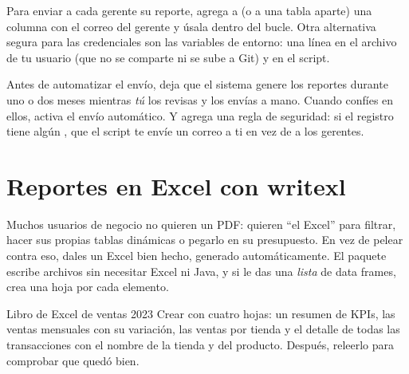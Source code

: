 Para enviar a cada gerente su reporte, agrega a  (o a
una tabla aparte) una columna con el correo del gerente y úsala dentro del
bucle. Otra alternativa segura para las credenciales son las variables de
entorno: una línea  en el archivo
 de tu usuario (que no se comparte ni se sube a Git) y
 en el script.

\begin{consejo}
Antes de automatizar el envío, deja que el sistema genere los reportes
durante uno o dos meses mientras \emph{tú} los revisas y los envías a mano.
Cuando confíes en ellos, activa el envío automático. Y agrega una regla de
seguridad: si el registro tiene algún , que el script te envíe
un correo a ti en vez de a los gerentes.
\end{consejo}

\section{Reportes en Excel con writexl}
\label{sec:m8-excel}

Muchos usuarios de negocio no quieren un PDF: quieren ``el Excel'' para
filtrar, hacer sus propias tablas dinámicas o pegarlo en su presupuesto. En
vez de pelear contra eso, dales un Excel bien hecho, generado
automáticamente. El paquete  escribe archivos
 sin necesitar Excel ni Java, y si le das una \emph{lista}
de data frames, crea una hoja por cada elemento.

\begin{ejemplo}{Libro de Excel de ventas 2023}
Crear  con cuatro hojas: un
resumen de KPIs, las ventas mensuales con su variación, las ventas por
tienda y el detalle de todas las transacciones con el nombre de la tienda y
del producto. Después, releerlo para comprobar que quedó bien.
\end{ejemplo}

